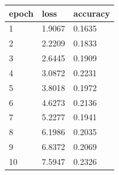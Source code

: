 \begin{tabular}{lll}
\hline
epoch & loss & accuracy \\
\hline
1 & 1.9067 & 0.1635 \\
2 & 2.2209 & 0.1833 \\
3 & 2.6445 & 0.1909 \\
4 & 3.0872 & 0.2231 \\
5 & 3.8018 & 0.1972 \\
6 & 4.6273 & 0.2136 \\
7 & 5.2277 & 0.1941 \\
8 & 6.1986 & 0.2035 \\
9 & 6.8372 & 0.2069 \\
10 & 7.5947 & 0.2326 \\
\hline
\end{tabular}
